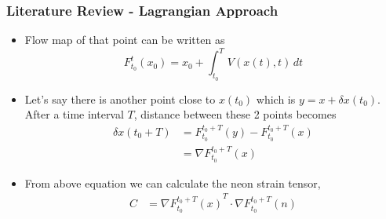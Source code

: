 \documentclass[../presentation.tex]{subfiles}
\begin{document}
\begin{frame}
  \frametitle{Literature Review - Lagrangian Approach}

  \begin{itemize}
    \item Flow map of that point can be written as
    \begin{equation}
      F_{t_0}^t(x_0) = x_0 + \int_{t_0}^{T} V(x(t), t)\,dt
    \end{equation}

    \item Let's say there is another point close to \(x(t_0)\) which is \(y = x + \delta x(t_0)\). After a time interval \(T\), distance between these 2 points becomes
    \begin{equation}
      \begin{aligned}
        \delta x(t_0 + T) &= F_{t_0}^{t_0 + T} (y) - F_{t_0}^{t_0 + T} (x) \\
        &= \nabla F_{t_0}^{t_0 + T}(x)
      \end{aligned}
    \end{equation}

    \item From above equation we can calculate the neon strain tensor,
    \begin{equation}
      \begin{aligned}
        C &= \nabla {F_{t_0}^{t_0 + T}(x)}^T \cdot \nabla F_{t_0}^{t_0 + T}(n)
      \end{aligned}
    \end{equation}
  \end{itemize}
\end{frame}
\end{document}
